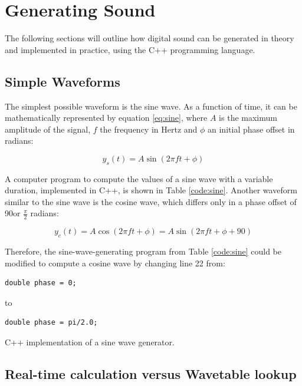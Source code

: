 \documentclass[12pt]{report}
\begin{document}
\chapter{Generating Sound}

The following sections will outline how digital sound can be generated in theory and implemented in practice, using the C++ programming language.

\section{Simple Waveforms}

The simplest possible waveform is the sine wave. As a function of time, it can be mathematically represented by equation \ref{eq:sine}, where $A$ is the maximum amplitude of the signal, $f$ the frequency in Hertz and $\phi$ an initial phase offset in radians:

\begin{equation}
  y_{s}(t) = A \sin(2 \pi  f t + \phi)
  \label{eq:sine}
\end{equation}

A computer program to compute the values of a sine wave with a variable duration, implemented in C++, is shown in Table \ref{code:sine}. Another waveform similar to the sine wave is the cosine wave, which differs only in a phase offset of 90\degree or $\frac{\pi}{2}$ radians:

\begin{equation}
  y_{c}(t) = A \cos(2 \pi  f t + \phi) = A \sin(2 \pi f t + \phi + 90)
  \label{eq:cosine}
\end{equation}

Therefore, the sine-wave-generating program from Table \ref{code:sine} could be modified to compute a cosine wave by changing line 22 from:\\

\begin{lstlisting}[firstnumber=22]
  double phase = 0;
\end{lstlisting}
to
\begin{lstlisting}[firstnumber=22]
  double phase = pi/2.0;
\end{lstlisting}

\begin{table}
  
  \label{code:sine}
  \caption{C++ implementation of a sine wave generator.}
\end{table}

\section{Real-time calculation versus Wavetable lookup}
\end{document}
